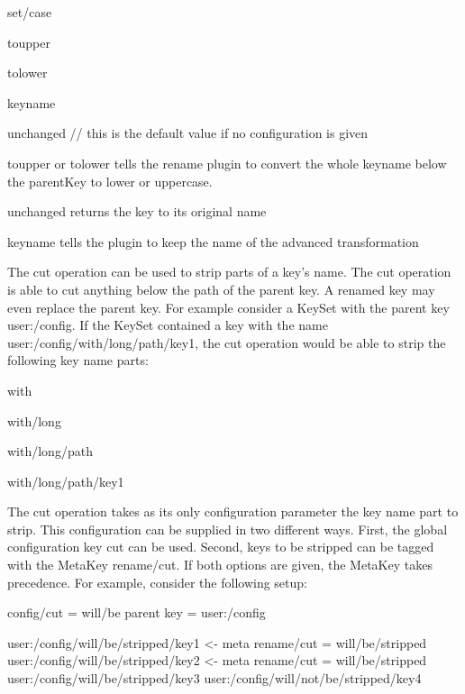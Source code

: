 {\ttfamily set/case}


\begin{DoxyItemize}
\item toupper
\item tolower
\item keyname
\item unchanged // this is the default value if no configuration is given
\end{DoxyItemize}

{\ttfamily toupper} or {\ttfamily tolower} tells the rename plugin to convert the whole keyname below the parent\+Key to lower or uppercase.

{\ttfamily unchanged} returns the key to its original name

{\ttfamily keyname} tells the plugin to keep the name of the advanced transformation

The cut operation can be used to strip parts of a key’s name. The cut operation is able to cut anything below the path of the parent key. A renamed key may even replace the parent key. For example consider a Key\+Set with the parent key {\ttfamily user\+:/config}. If the Key\+Set contained a key with the name {\ttfamily user\+:/config/with/long/path/key1}, the cut operation would be able to strip the following key name parts\+:


\begin{DoxyItemize}
\item with
\item with/long
\item with/long/path
\item with/long/path/key1
\end{DoxyItemize}

The cut operation takes as its only configuration parameter the key name part to strip. This configuration can be supplied in two different ways. First, the global configuration key {\ttfamily cut} can be used. Second, keys to be stripped can be tagged with the Meta\+Key {\ttfamily rename/cut}. If both options are given, the Meta\+Key takes precedence. For example, consider the following setup\+:


\begin{DoxyCode}
config/cut = will/be
parent key = user:/config

user:/config/will/be/stripped/key1              <- meta rename/cut = will/be/stripped
user:/config/will/be/stripped/key2              <- meta rename/cut = will/be/stripped
user:/config/will/be/stripped/key3
user:/config/will/not/be/stripped/key4
\end{DoxyCode}


